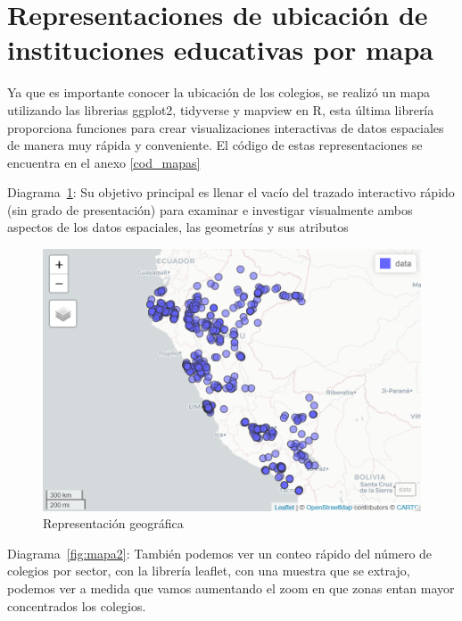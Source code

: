 \section{Representaciones de ubicación de instituciones educativas por mapa}

Ya que es importante conocer la ubicación de los colegios, se realizó un mapa utilizando las librerias ggplot2, tidyverse y mapview en R, esta última librería proporciona funciones para crear visualizaciones interactivas de datos espaciales de manera muy rápida y conveniente. El código de estas representaciones se encuentra en el anexo \ref{cod_mapas}

Diagrama~\ref{fig:mapa1}: Su objetivo principal es llenar el vacío del trazado interactivo rápido (sin grado de presentación) para examinar e investigar visualmente ambos aspectos de los datos espaciales, las geometrías y sus atributos

\begin{figure}[th]
\centering
\includegraphics[width=1\textwidth]{Figures/mapa1}
\decoRule
\caption[Mapa]{Representación geográfica}
\label{fig:mapa1}
\end{figure}

Diagrama~\ref{fig:mapa2}: También podemos ver un conteo rápido del número de colegios por sector, con la librería leaflet, con una muestra que se extrajo, podemos ver a medida que vamos aumentando el zoom en que zonas entan mayor concentrados los colegios. 

